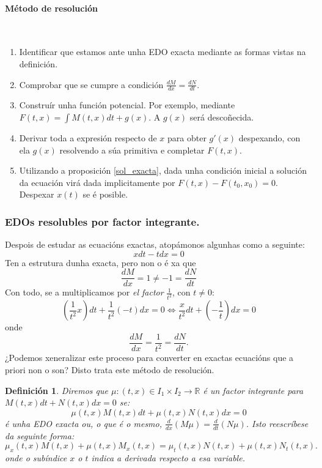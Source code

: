 \documentclass[11pt, a4paper,twoside]{article}
\newcommand{\iindex}[1]{\emph{#1}\index{#1}}
\theoremstyle{theorem-style}  %
\theoremstyle{definition-style}
\newtheorem{definition}{Definición}[section]
\theoremstyle{example-style}
\begin{document}
\paragraph{Método de resolución} \ 
\begin{enumerate}
	\item Identificar que estamos ante unha EDO exacta mediante as formas vistas na definición.
	\item Comprobar que se cumpre a condición $\frac{dM}{dx} = \frac{dN}{dt}$.
	\item Construír unha función potencial. Por exemplo, mediante $ F(t,x)=\int M(t, x)dt + g(x) $. A $ g(x) $ será descoñecida.
	\item Derivar toda a expresión respecto de $ x $ para obter $ g'(x) $ despexando, con ela $ g(x) $ resolvendo a súa primitiva e completar $ F(t,x) $.
	\item Utilizando a proposición \ref{sol_exacta}, dada unha condición inicial a solución da ecuación virá dada implicitamente por $F(t, x) - F(t_0, x_0) = 0$. Despexar $ x(t) $ se é posible. 
\end{enumerate}
\subsubsection{EDOs resolubles por factor integrante.}
Despois de estudar as ecuacións exactas, atopámonos algunhas como a seguinte:
\[ xdt - tdx = 0 \] 
Ten a estrutura dunha exacta, pero non o é xa que 
\[ \frac{dM}{dx}=1\neq-1=\frac{dN}{dt} \]
Con todo, se a multiplicamos por \textit{el factor} $\frac{1}{t^2}$, con $t \neq 0$:
\[(\frac{1}{t^2}x)dt + \frac{1}{t^2}(-t)dx = 0 \Leftrightarrow \frac{x}{t^2}dt + (-\frac{1}{t})dx = 0\]
onde
\[\frac{dM}{dx} = \frac{1}{t^2} = \frac{dN}{dt}.\]
¿Podemos xeneralizar este proceso para converter en exactas ecuacións que a priori non o son? Disto trata este método de resolución.
\begin{definition}
	Diremos que $\mu : (t, x) \in I_1 \times I_2 \longrightarrow \mathbb{R}$ é un \iindex{factor integrante} para $M(t, x)dt + N(t, x)dx = 0$ se:
	\[\mu(t, x)M(t, x)dt + \mu(t, x)N(t, x)dx = 0\]
	é unha EDO exacta ou, o que é o mesmo, $\frac{d}{dx}(M\mu) = \frac{d}{dt}(N\mu)$. Isto reescríbese da seguinte forma:
	\begin{equation} \label{eqInte}
	\mu_x(t, x)M(t, x) + \mu(t, x)M_x(t, x) = \mu_t(t, x)N(t, x) + \mu(t, x)N_t(t, x).
	\end{equation}
	onde o subíndice $ x $ o $ t $ indica a derivada respecto a esa variable.
\end{definition}
\end{document}
